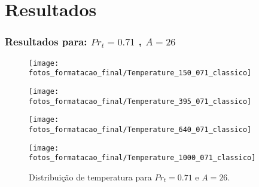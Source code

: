 \documentclass[xcolor=dvipsnames,10pt,aspectratio=169]{beamer}
\begin{document}
	\section{Resultados}
  \begin{frame}
    \frametitle{Resultados para: $Pr_t= 0.71$ , $A = 26 $}
    \begin{figure}[!h]
        \centering
        \begin{minipage}{0.49\textwidth}
          \centering
          \texttt{[image: fotos\_formatacao\_final/Temperature\_150\_071\_classico]}
          \caption{$Re_\tau = 150$, $L2_t = 1.42$}
        \end{minipage}
        \hfill
        \begin{minipage}{0.49\textwidth}
          \centering
          \texttt{[image: fotos\_formatacao\_final/Temperature\_395\_071\_classico]}
          \caption{$Re_\tau = 395$, $L2_t = 1.55$}
        \end{minipage}
        \begin{minipage}{0.49\textwidth}
          \centering
          \texttt{[image: fotos\_formatacao\_final/Temperature\_640\_071\_classico]}
          \caption{$Re_\tau = 640$, $L2_t = 1.79$}
        \end{minipage}
        \hfill
        \begin{minipage}{0.49\textwidth}
          \centering
          \texttt{[image: fotos\_formatacao\_final/Temperature\_1000\_071\_classico]}
          \caption{$Re_\tau = 1020$, $L2_t = 2.04$}
        \end{minipage}
        \caption{Distribuição de temperatura para $Pr_t = 0.71$ e $A = 26$.} 
        \label{figuraresultados1}
    \end{figure}
  \end{frame}
	
	
	
	
		
\end{document}
